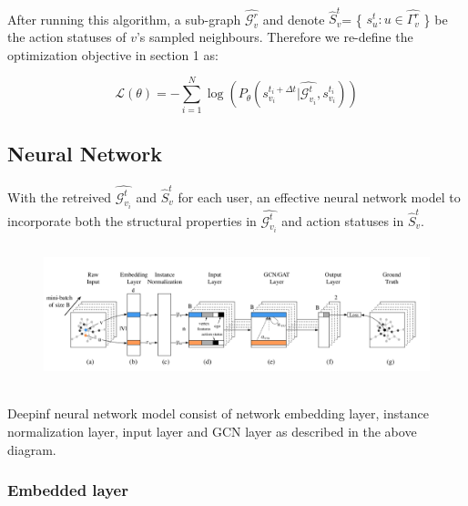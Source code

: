 \paragraph{} After running this algorithm, a sub-graph $\hat{\mathcal{G}_v^r}$ and denote $\hat{S}_v^t$=
\{ $s_u^t :u \in \hat{\Gamma_v^r}$ \} be the action statuses of $v$'s sampled neighbours. Therefore we re-define the optimization
objective in section 1 as:

\begin{equation}
    \mathcal{L}(\theta) = -\sum_{i=1}^N \log(P_{\theta}(s_{v_i}^{t_i+\Delta t}|\hat{\mathcal{G}_{v_i}^{t}},s_{v_i}^{t_i}))
\end{equation}


\subsection{Neural Network}
\paragraph{} With the retreived $\hat{\mathcal{G}_{v_i}^{t}}$ and $\hat{S}_v^t$ for each user, an effective
neural network model to incorporate both the structural properties in $\hat{\mathcal{G}_{v_i}^{t}}$ and action statuses in 
$\hat{S}_v^t$.

\begin{figure}
    \includegraphics[width=12cm,height=4cm]{tex/img/framework.png}
\end{figure}

\paragraph{} Deepinf neural network model consist of network embedding layer, instance normalization layer, input layer
and GCN layer as described in the above diagram.


\subsubsection{Embedded layer}

